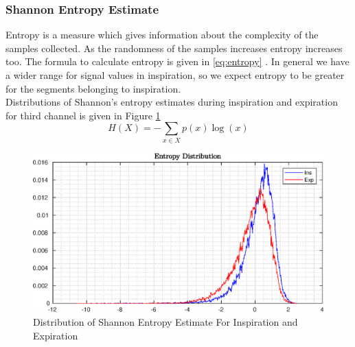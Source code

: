 \subsubsection{Shannon Entropy Estimate}
Entropy is a measure which gives information about the complexity of the samples collected. As the randomness of the samples increases entropy increases too. The formula to calculate entropy is given in \eqref{eq:entropy} \cite{info-theory}.  In general we have a wider range for signal values in inspiration, so we expect entropy to be greater for the segments belonging to inspiration. \\ Distributions of Shannon's entropy estimates during inspiration and expiration for third channel is given in Figure \ref{fig:entropy_ins_exp}
\begin{equation}\label{eq:entropy}
	H(X) = - \sum_{x \in X}p(x)\log(x)
\end{equation}
\begin{figure}
	\begin{center}
		\includegraphics[width=\textwidth]{figures/entropy_ins_exp.eps}
		\caption{Distribution of Shannon Entropy Estimate For Inspiration and Expiration}
		\label{fig:entropy_ins_exp}
	\end{center}
\end{figure} 
